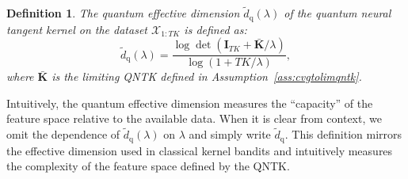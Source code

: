 \documentclass[pdflatex,sn-mathphys-num]{sn-jnl}%
\theoremstyle{thmstyleone}%
\theoremstyle{thmstyletwo}%
\theoremstyle{thmstylethree}%
\newtheorem{definition}{Definition}%
\newcommand{\E}{\mathbb{E}}
\newcommand{\xbf}{\mathbf{x}}
\newcommand{\Kbf}{\mathbf{K}}
\newcommand{\Ibf}{\mathbf{I}}
\newcommand{\thetabf}{\bm{\theta}}
\begin{document}

\begin{definition}\label{def:q-eff-dim}
  The {\em quantum effective dimension} $\widetilde{d}_{\mathrm{q}}(\lambda)$ of the quantum neural tangent kernel on the dataset $\mathcal{X}_{1:TK}$ is defined as: 
$$\widetilde{d}_{\mathrm{q}}(\lambda) = \frac{\log \det(\Ibf_{TK} + \bar{\Kbf} / \lambda)}{\log(1 + TK / \lambda)},$$ where $\bar{\Kbf}$ is the limiting QNTK defined in Assumption~\ref{ass:cvgtolimqntk}. %
\end{definition} 


Intuitively, the quantum effective dimension measures the ``capacity'' of the feature space relative to the available data. When it is clear from context, we omit the dependence of $\widetilde{d}_{\mathrm{q}}(\lambda)$ on $\lambda$ and simply write $\widetilde{d}_{\mathrm{q}}$. %
This definition mirrors the effective dimension used in classical kernel bandits \cite{neuralucb} and intuitively measures the complexity of the feature space defined by the QNTK.
\end{document}
